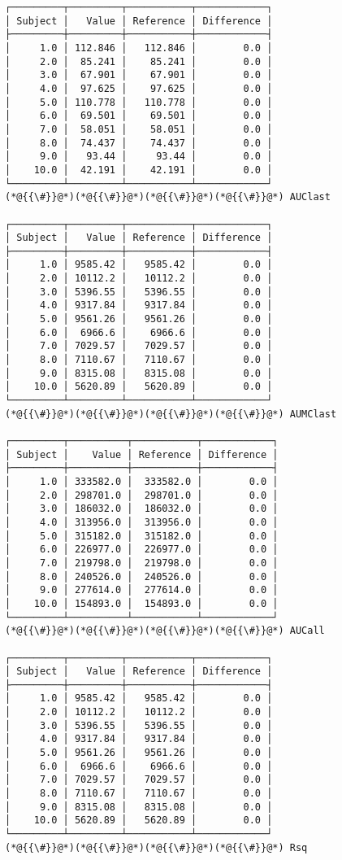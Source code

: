 \documentclass[12pt,a4paper]{article}
\begin{document}
\begin{lstlisting}
┌─────────┬─────────┬───────────┬────────────┐
│ Subject │   Value │ Reference │ Difference │
├─────────┼─────────┼───────────┼────────────┤
│     1.0 │ 112.846 │   112.846 │        0.0 │
│     2.0 │  85.241 │    85.241 │        0.0 │
│     3.0 │  67.901 │    67.901 │        0.0 │
│     4.0 │  97.625 │    97.625 │        0.0 │
│     5.0 │ 110.778 │   110.778 │        0.0 │
│     6.0 │  69.501 │    69.501 │        0.0 │
│     7.0 │  58.051 │    58.051 │        0.0 │
│     8.0 │  74.437 │    74.437 │        0.0 │
│     9.0 │   93.44 │     93.44 │        0.0 │
│    10.0 │  42.191 │    42.191 │        0.0 │
└─────────┴─────────┴───────────┴────────────┘
(*@{{\#}}@*)(*@{{\#}}@*)(*@{{\#}}@*)(*@{{\#}}@*) AUClast

┌─────────┬─────────┬───────────┬────────────┐
│ Subject │   Value │ Reference │ Difference │
├─────────┼─────────┼───────────┼────────────┤
│     1.0 │ 9585.42 │   9585.42 │        0.0 │
│     2.0 │ 10112.2 │   10112.2 │        0.0 │
│     3.0 │ 5396.55 │   5396.55 │        0.0 │
│     4.0 │ 9317.84 │   9317.84 │        0.0 │
│     5.0 │ 9561.26 │   9561.26 │        0.0 │
│     6.0 │  6966.6 │    6966.6 │        0.0 │
│     7.0 │ 7029.57 │   7029.57 │        0.0 │
│     8.0 │ 7110.67 │   7110.67 │        0.0 │
│     9.0 │ 8315.08 │   8315.08 │        0.0 │
│    10.0 │ 5620.89 │   5620.89 │        0.0 │
└─────────┴─────────┴───────────┴────────────┘
(*@{{\#}}@*)(*@{{\#}}@*)(*@{{\#}}@*)(*@{{\#}}@*) AUMClast

┌─────────┬──────────┬───────────┬────────────┐
│ Subject │    Value │ Reference │ Difference │
├─────────┼──────────┼───────────┼────────────┤
│     1.0 │ 333582.0 │  333582.0 │        0.0 │
│     2.0 │ 298701.0 │  298701.0 │        0.0 │
│     3.0 │ 186032.0 │  186032.0 │        0.0 │
│     4.0 │ 313956.0 │  313956.0 │        0.0 │
│     5.0 │ 315182.0 │  315182.0 │        0.0 │
│     6.0 │ 226977.0 │  226977.0 │        0.0 │
│     7.0 │ 219798.0 │  219798.0 │        0.0 │
│     8.0 │ 240526.0 │  240526.0 │        0.0 │
│     9.0 │ 277614.0 │  277614.0 │        0.0 │
│    10.0 │ 154893.0 │  154893.0 │        0.0 │
└─────────┴──────────┴───────────┴────────────┘
(*@{{\#}}@*)(*@{{\#}}@*)(*@{{\#}}@*)(*@{{\#}}@*) AUCall

┌─────────┬─────────┬───────────┬────────────┐
│ Subject │   Value │ Reference │ Difference │
├─────────┼─────────┼───────────┼────────────┤
│     1.0 │ 9585.42 │   9585.42 │        0.0 │
│     2.0 │ 10112.2 │   10112.2 │        0.0 │
│     3.0 │ 5396.55 │   5396.55 │        0.0 │
│     4.0 │ 9317.84 │   9317.84 │        0.0 │
│     5.0 │ 9561.26 │   9561.26 │        0.0 │
│     6.0 │  6966.6 │    6966.6 │        0.0 │
│     7.0 │ 7029.57 │   7029.57 │        0.0 │
│     8.0 │ 7110.67 │   7110.67 │        0.0 │
│     9.0 │ 8315.08 │   8315.08 │        0.0 │
│    10.0 │ 5620.89 │   5620.89 │        0.0 │
└─────────┴─────────┴───────────┴────────────┘
(*@{{\#}}@*)(*@{{\#}}@*)(*@{{\#}}@*)(*@{{\#}}@*) Rsq


\end{lstlisting}
\end{document}
